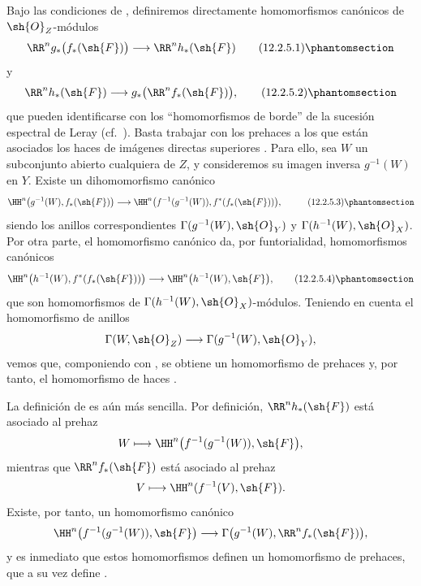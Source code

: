 \documentclass[oneside]{amsart}
\newcommand{\oldpage}[2][]{{\marginnote{\normalfont\textbf{#1}~|~#2}}\ignorespaces}
\let\EGAOriginalLabel\label
\renewcommand{\label}[1]{\phantomsection\EGAOriginalLabel{#1}}
\begin{document}
\begin{env}[12.2.5]
\label{0.12.2.5}
Bajo las condiciones de , definiremos directamente
homomorfismos canónicos de $\sh{O}_Z$-módulos
\[
  \RR^n g_*\bigl(f_*(\sh{F})\bigr)
  \longrightarrow\RR^n h_*(\sh{F})
  \tag{12.2.5.1}
  \label{0.12.2.5.1}
\]
y
\[
  \RR^n h_*(\sh{F})
  \longrightarrow g_*\bigl(\RR^n f_*(\sh{F})\bigr),
  \tag{12.2.5.2}
  \label{0.12.2.5.2}
\]
\oldpage[0\textsubscript{III}]{59}
que pueden identificarse con los ``homomorfismos de borde'' de la sucesión
espectral de Leray (cf.\ ).
Basta trabajar con los prehaces a los que están asociados los haces de
imágenes directas superiores .
Para ello, sea $W$ un subconjunto abierto cualquiera de $Z$, y consideremos
su imagen inversa $g^{-1}(W)$ en $Y$.  Existe un
dihomomorfismo canónico
\[
  \begin{aligned}
  \HH^n\bigl(g^{-1}(W),f_*(\sh{F})\bigr)
  &\longrightarrow
  \HH^n\bigl(f^{-1}(g^{-1}(W)),
    f^*(f_*(\sh{F}))\bigr),
  \end{aligned}
  \tag{12.2.5.3}
  \label{0.12.2.5.3}
\]
siendo los anillos correspondientes
$\Gamma(g^{-1}(W),\sh{O}_Y)$ y
$\Gamma(h^{-1}(W),\sh{O}_X)$.
Por otra parte, el homomorfismo canónico
 da, por funtorialidad,
homomorfismos canónicos
\[
  \HH^n\bigl(h^{-1}(W),f^*(f_*(\sh{F}))\bigr)
  \longrightarrow
  \HH^n\bigl(h^{-1}(W),\sh{F}\bigr),
  \tag{12.2.5.4}
  \label{0.12.2.5.4}
\]
que son homomorfismos de
$\Gamma(h^{-1}(W),\sh{O}_X)$-módulos.
Teniendo en cuenta el homomorfismo de anillos
\[
  \Gamma(W,\sh{O}_Z)
  \longrightarrow\Gamma(g^{-1}(W),\sh{O}_Y),
\]
vemos que, componiendo  con
, se obtiene un homomorfismo de prehaces y, por tanto, el
homomorfismo de haces .

La definición de  es aún más sencilla.
Por definición, $\RR^n h_*(\sh{F})$ está asociado al prehaz
\[
  W\longmapsto
  \HH^n\bigl(f^{-1}(g^{-1}(W)),\sh{F}\bigr),
\]
mientras que $\RR^n f_*(\sh{F})$ está asociado al prehaz
\[
  V\longmapsto\HH^n(f^{-1}(V),\sh{F}).
\]
Existe, por tanto, un homomorfismo canónico
\[
  \HH^n\bigl(f^{-1}(g^{-1}(W)),\sh{F}\bigr)
  \longrightarrow
  \Gamma\bigl(g^{-1}(W),\RR^n f_*(\sh{F})\bigr),
\]
y es inmediato que estos homomorfismos definen un homomorfismo de
prehaces, que a su vez define .
\end{env}
\end{document}
